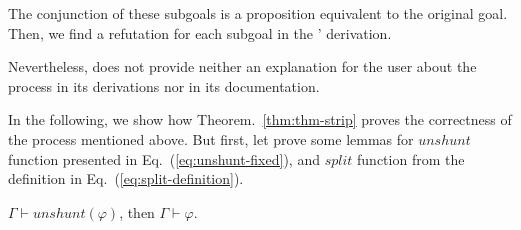 \documentclass[../main.tex]{subfiles}
\begin{document}
The conjunction of these subgoals is a proposition equivalent to the
original goal. Then, we find a refutation for each subgoal in the \Metis' \TSTP derivation.

Nevertheless, \Metis does not provide neither an explanation for the user about the process in its \TSTP derivations nor in its documentation.

In the following, we show how Theorem.~\ref{thm:thm-strip} proves the correctness of the process mentioned above. But first, let prove some lemmas for $unshunt$ function presented in Eq.~(\ref{eq:unshunt-fixed}),
and $split$ function from the definition in Eq.~(\ref{eq:split-definition}).

\begin{lemma}
  \label{lem:unshunt}
  $Γ ⊢ unshunt(φ)$, then $Γ ⊢ φ$.
\end{lemma}
\end{document}
